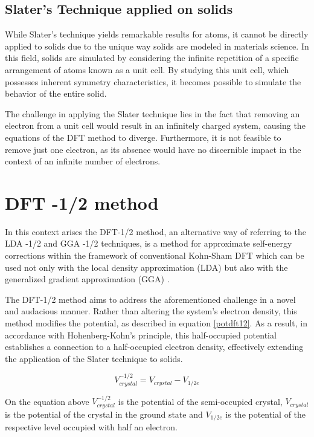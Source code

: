 \subsection{Slater's Technique applied on solids}

While Slater's technique yields remarkable results for atoms, it cannot be directly applied to solids due to the unique way solids are modeled in materials science. In this field, solids are simulated by considering the infinite repetition of a specific arrangement of atoms known as a unit cell. By studying this unit cell, which possesses inherent symmetry characteristics, it becomes possible to simulate the behavior of the entire solid.


The challenge in applying the Slater technique lies in the fact that removing an electron from a unit cell would result in an infinitely charged system, causing the equations of the DFT method to diverge. Furthermore, it is not feasible to remove just one electron, as its absence would have no discernible impact in the context of an infinite number of electrons.

\section{DFT -1/2 method}
In this context arises the DFT-1/2 method, an alternative way of referring to the LDA -1/2 and GGA -1/2 \cite{PhysRevB.78.125116} \cite{doi:10.1063/1.3624562} techniques, is a method for approximate self-energy corrections within the framework of conventional Kohn-Sham DFT which can be used not only with the local density approximation (LDA) \cite{LDA} but also with the generalized gradient approximation (GGA) \cite{GGA}.

The DFT-1/2 method aims to address the aforementioned challenge in a novel and audacious manner. Rather than altering the system's electron density, this method modifies the potential, as described in equation \ref{potdft12}. As a result, in accordance with Hohenberg-Kohn's principle, this half-occupied potential establishes a connection to a half-occupied electron density, effectively extending the application of the Slater technique to solids.

\begin{equation}
\label{potdft12}
V_{crystal}^{-1/2} = V_{crystal} - V_{1/2e}   
\end{equation}
   
On the equation above $V_ {crystal}^{- 1/2}$ is the potential of the semi-occupied crystal, $V_ {crystal}$
is the potential of the crystal in the ground state and $V_ {1 / 2e}$ is the potential of the respective level
occupied with half an electron. 


